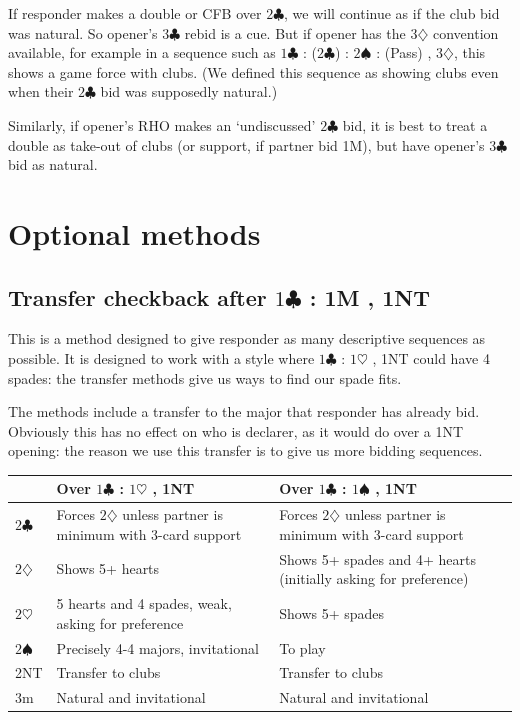 \documentclass{article}
\newcommand{\sz}{\spadesuit}
\newcommand{\hz}{\heartsuit}
\newcommand{\dz}{\diamondsuit}
\newcommand{\cz}{\clubsuit}
\newcommand{\st}{\rule{0pt}{4mm}}
\begin{document}
If responder makes a double or CFB over $2\cz$, we will continue as if the club bid was natural. So opener's $3\cz$ rebid is a cue. But if opener has the $3\dz$ convention available, for example in a sequence such as $1\cz$ : ($2\cz$) : $2\sz$ : (Pass) , $3\dz$, this shows a game force with clubs. (We defined this sequence as showing clubs even when their $2\cz$ bid was supposedly natural.)

Similarly, if opener's RHO makes an `undiscussed' $2\cz$ bid, it is best to treat a double as take-out of clubs (or support, if partner bid 1M), but have opener's $3\cz$ bid as natural.

\newpage
\section{Optional methods}

\subsection{Transfer checkback after $1\cz$ : 1M , 1NT}

This is a method designed to give responder as many descriptive sequences as possible. It is designed to work with a style where $1\cz$ : $1\hz$ , 1NT could have 4 spades: the transfer methods give us ways to find our spade fits.

The methods include a transfer to the major that responder has already bid. Obviously this has no effect on who is declarer, as it would do over a 1NT opening: the reason we use this transfer is to give us more bidding sequences.

\begin{center}
\begin{tabular}{|l|p{5cm}|p{5cm}|} \hline
 & \st Over $1\cz$ : $1\hz$ , 1NT & Over $1\cz$ : $1\sz$ , 1NT \\ \hline
$2\cz$ & \st Forces $2\dz$ unless partner is minimum with 3-card support & Forces $2\dz$ unless partner is minimum with 3-card support \\ \hline
$2\dz$ & \st Shows 5+ hearts & Shows 5+ spades and 4+ hearts (initially asking for preference) \\ \hline
$2\hz$ & \st 5 hearts and 4 spades, weak, asking for preference & Shows 5+ spades \\ \hline
$2\sz$ & \st Precisely 4-4 majors, invitational & To play \\ \hline
2NT & \st Transfer to clubs & Transfer to clubs \\ \hline
3m & \st Natural and invitational & Natural and invitational \\ \hline
\end{tabular}
\end{center}
\end{document}
